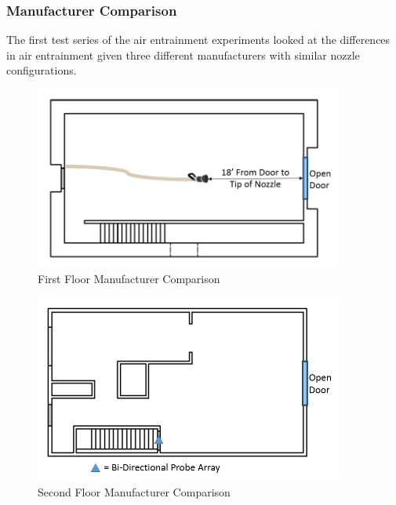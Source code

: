 \documentclass{article}
\begin{document}
\clearpage

\subsubsection{Manufacturer Comparison}

The first test series of the air entrainment experiments looked at the differences in air entrainment given three different manufacturers with similar nozzle configurations. 

\begin{figure}[!ht]
	\centering
	\includegraphics[width=4in]{Figures/Air_Entrainment/Measurement_Locations_Firstfloor.png}
	\caption{First Floor Manufacturer Comparison}
	\label{fig:First_Floor_Manufacturer_Comparison}
\end{figure}

\begin{figure}[!ht]
	\centering
	\includegraphics[width=4in]{Figures/Air_Entrainment/Measurement_Locations_Secondfloor.png}
	\caption{Second Floor Manufacturer Comparison}
	\label{fig:Second_Floor_Manufacturer_Comparison}
\end{figure}
\end{document}
